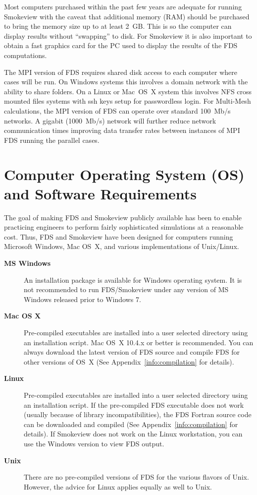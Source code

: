 \documentclass[11pt]{book}
\begin{document}
Most computers purchased within the past few years are adequate for running Smokeview with the caveat that additional memory (RAM) should be purchased to bring the memory size up to at least 2~GB. This is so the computer can display results without ``swapping'' to disk. For Smokeview it is also important to obtain a fast graphics card for the PC used to display the results of the FDS computations.

The MPI version of FDS requires shared disk access to each computer where cases will be run.  On Windows systems this involves a domain network with the ability to share folders.  On a Linux or Mac~OS~X system this involves NFS cross mounted files systems with ssh keys setup for passwordless login. For Multi-Mesh calculations, the MPI version of FDS can operate over standard 100~Mb/s networks. A gigabit (1000~Mb/s) network will further reduce network communication times improving data transfer rates between instances of MPI FDS running the parallel cases.


\section{Computer Operating System (OS) and Software Requirements}

The goal of making FDS and Smokeview publicly available has been to enable practicing engineers to perform fairly sophisticated simulations at a reasonable cost. Thus, FDS and Smokeview have been designed for computers running Microsoft Windows, Mac OS~X, and various implementations of Unix/Linux.
\begin{description}
\item[{\bf MS Windows}] An installation package is available for Windows operating system. It is not recommended to run FDS/Smokeview under any version of MS Windows released prior to Windows 7.
\item[{\bf Mac OS X}] Pre-compiled executables are installed into a user selected directory using an installation script.  Mac OS~X 10.4.x or better is recommended. You can always download the latest version of FDS source and compile FDS for other versions of OS~X (See Appendix~\ref{info:compilation} for details).
\item[{\bf Linux}] Pre-compiled executables are installed into a user selected directory using an installation script. If the pre-compiled FDS executable does not work (usually because of library incompatibilities), the FDS Fortran source code can be downloaded and compiled (See Appendix~\ref{info:compilation} for details). If Smokeview does not work on the Linux workstation, you can use the Windows version to view FDS output.
\item[{\bf Unix}] There are no pre-compiled versions of FDS for the various flavors of Unix. However, the advice for Linux applies equally as well to Unix.
\end{description}
\end{document}
